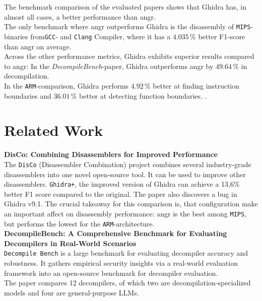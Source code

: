 \documentclass[seminar]{plai}
\begin{document}
The benchmark comparison of the evaluated papers shows that Ghidra has, in almost all cases, a better performance than angr.\\
The only benchmark where angr outperforms Ghidra is the disassembly of \texttt{MIPS}-binaries from\texttt{GCC}- and \texttt{Clang} Compiler, where it has a $4.035\,\%$ better F1-score than angr on average.\cite{DisCo-combining-disassemblers-for-improved-performance}\\
Across the other performance metrics, Ghidra exhibits superior results compared to angr: In the \textit{DecompileBench}-paper, Ghidra outperforms angr by $49.64\,\%$ in decompilation.\cite{decompileBench-comprehensice-benchmark-for-evaluating-decompilers-in-real-world-scenarios}\\
In the \texttt{ARM}-comparison, Ghidra performs $4.92\,\%$ better at finding instruction boundaries and $36.01\,\%$ better at detecting function boundaries. \cite{an-empirical-study-on-ARM-disassembly-disassembly-tools}. 

\section{Related Work}
\label{sec:related-work}
\textbf{DisCo: Combining Disassemblers for Improved Performance}\\
The \texttt{DisCo} (Disassembler Combination) project combines several industry-grade disassemblers into one novel open-source tool. It can be used to improve other disassemblers. \texttt{Ghidra+}, the improved version of Ghidra can achieve a 13,6\% better F1 score compared to the original. The paper also discovers a bug in Ghidra v9.1. The crucial takeaway for this comparison is, that configuration make an important affect on disassembly performance: angr is the best among \texttt{MIPS}, but performs the lowest for the \texttt{ARM}-architecture.\cite{DisCo-combining-disassemblers-for-improved-performance}\\

\noindent\textbf{DecompileBench: A Comprehensive Benchmark for Evaluating Decompilers in Real-World Scenarios}\\
\texttt{Decompile Bench} is a large benchmark for evaluating decompiler accuracy and robustness. It gathers empirical security insights via a real-world evaluation framework into an open-source benchmark for decompiler evaluation.\\
The paper compares 12 decompilers, of which two are decompilation-specialized models and four are general-purpose LLMs.\cite{decompileBench-comprehensice-benchmark-for-evaluating-decompilers-in-real-world-scenarios}\\
\end{document}
